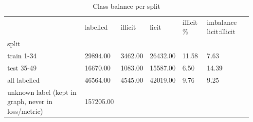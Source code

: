 \begin{table}
\caption{Class balance per split}
\label{tab:01_class_balance}
\begin{tabular}{llllll}
\toprule
 & labelled & illicit & licit & illicit \% & imbalance licit:illicit \\
split &  &  &  &  &  \\
\midrule
train 1-34 & 29894.00 & 3462.00 & 26432.00 & 11.58 & 7.63 \\
test 35-49 & 16670.00 & 1083.00 & 15587.00 & 6.50 & 14.39 \\
all labelled & 46564.00 & 4545.00 & 42019.00 & 9.76 & 9.25 \\
unknown label (kept in graph, never in loss/metric) & 157205.00 &  &  &  &  \\
\bottomrule
\end{tabular}
\end{table}
